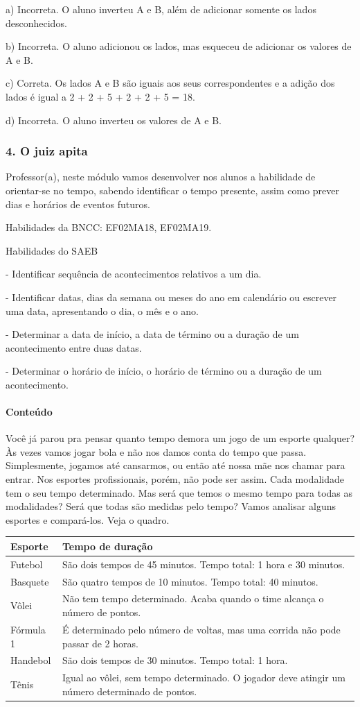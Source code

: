 a) Incorreta. O aluno inverteu A e B, além de adicionar somente os lados
desconhecidos.

b) Incorreta. O aluno adicionou os lados, mas esqueceu de adicionar os
valores de A e B.

c) Correta. Os lados A e B são iguais aos seus correspondentes e a
adição dos lados é igual a 2 + 2 + 5 + 2 + 2 + 5 = 18.

d) Incorreta. O aluno inverteu os valores de A e B.

\subsubsection{4. O juiz apita}\label{muxf3dulo-4-o-juiz-apita}

Professor(a), neste módulo vamos desenvolver nos alunos a habilidade de
orientar-se no tempo, sabendo identificar o tempo presente, assim como
prever dias e horários de eventos futuros. 

Habilidades da BNCC: EF02MA18, EF02MA19.

Habilidades do SAEB

- Identificar sequência de acontecimentos relativos a um dia.

- Identificar datas, dias da semana ou meses do ano em calendário ou
escrever uma data, apresentando o dia, o mês e o ano.

- Determinar a data de início, a data de término ou a duração de um
acontecimento entre duas datas.

- Determinar o horário de início, o horário de término ou a duração de
um acontecimento.

\paragraph{Conteúdo}\label{conteuxfado-3}

Você já parou pra pensar quanto tempo demora um jogo de um esporte
qualquer? Às vezes vamos jogar bola e não nos damos conta do tempo que
passa. Simplesmente, jogamos até cansarmos, ou então até nossa mãe nos
chamar para entrar. Nos esportes profissionais, porém, não pode ser
assim. Cada modalidade tem o seu tempo determinado. Mas será que temos o
mesmo tempo para todas as modalidades? Será que todas são medidas pelo
tempo? Vamos analisar alguns esportes e compará-los. Veja o quadro.

\begin{longtable}[]{@{}ll@{}}
\toprule
Esporte & Tempo de duração\tabularnewline
\midrule
\endhead
Futebol & São dois tempos de 45 minutos. Tempo total: 1 hora e 30
minutos.\tabularnewline
Basquete & São quatro tempos de 10 minutos. Tempo total: 40
minutos.\tabularnewline
Vôlei & Não tem tempo determinado. Acaba quando o time alcança o número
de pontos.\tabularnewline
Fórmula 1 & É determinado pelo número de voltas, mas uma corrida não
pode passar de 2 horas.\tabularnewline
Handebol & São dois tempos de 30 minutos. Tempo total: 1
hora.\tabularnewline
Tênis & Igual ao vôlei, sem tempo determinado. O jogador deve atingir um
número determinado de pontos.\tabularnewline
\bottomrule
\end{longtable}


